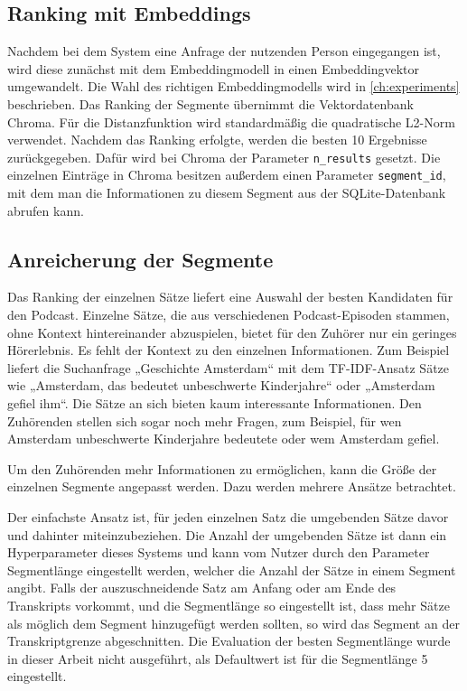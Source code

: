 \subsection{Ranking mit Embeddings}

Nachdem bei dem System eine Anfrage der nutzenden Person eingegangen ist, wird diese zunächst mit dem Embeddingmodell in einen Embeddingvektor umgewandelt.
Die Wahl des richtigen Embeddingmodells wird in \autoref{ch:experiments} beschrieben.
Das Ranking der Segmente übernimmt die Vektordatenbank Chroma.
Für die Distanzfunktion wird standardmäßig die quadratische L2-Norm verwendet.
Nachdem das Ranking erfolgte, werden die besten 10 Ergebnisse zurückgegeben.
Dafür wird bei Chroma der Parameter \verb|n_results| gesetzt.
Die einzelnen Einträge in Chroma besitzen außerdem einen Parameter \verb|segment_id|, mit dem man die Informationen zu diesem Segment aus der SQLite-Datenbank abrufen kann.


\subsection{Anreicherung der Segmente}

Das Ranking der einzelnen Sätze liefert eine Auswahl der besten Kandidaten für den Podcast.
Einzelne Sätze, die aus verschiedenen Podcast-Episoden stammen, ohne Kontext hintereinander abzuspielen, bietet für den Zuhörer nur ein geringes Hörerlebnis.
Es fehlt der Kontext zu den einzelnen Informationen.
Zum Beispiel liefert die Suchanfrage „Geschichte Amsterdam“ mit dem TF-IDF-Ansatz Sätze wie „Amsterdam, das bedeutet unbeschwerte Kinderjahre“ oder „Amsterdam gefiel ihm“.
Die Sätze an sich bieten kaum interessante Informationen.
Den Zuhörenden stellen sich sogar noch mehr Fragen, zum Beispiel, für wen Amsterdam unbeschwerte Kinderjahre bedeutete oder wem Amsterdam gefiel.

Um den Zuhörenden mehr Informationen zu ermöglichen, kann die Größe der einzelnen Segmente angepasst werden.
Dazu werden mehrere Ansätze betrachtet.

Der einfachste Ansatz ist, für jeden einzelnen Satz die umgebenden Sätze davor und dahinter miteinzubeziehen.
Die Anzahl der umgebenden Sätze ist dann ein Hyperparameter dieses Systems und kann vom Nutzer durch den Parameter Segmentlänge eingestellt werden, welcher die Anzahl der Sätze in einem Segment angibt.
Falls der auszuschneidende Satz am Anfang oder am Ende des Transkripts vorkommt, und die Segmentlänge so eingestellt ist, dass mehr Sätze als möglich dem Segment hinzugefügt werden sollten, so wird das Segment an der Transkriptgrenze abgeschnitten.
Die Evaluation der besten Segmentlänge wurde in dieser Arbeit nicht ausgeführt, als Defaultwert ist für die Segmentlänge 5 eingestellt.

